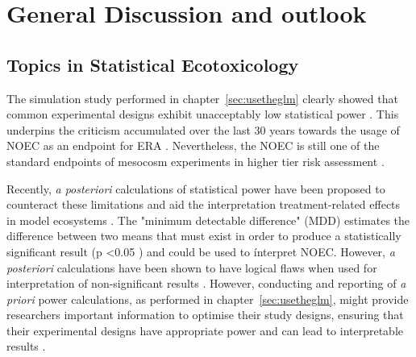 \chapter{General Discussion and outlook}
\label{sec:discussion} 
 
\section{Topics in Statistical Ecotoxicology}
The simulation study performed in chapter~\ref{sec:usetheglm} clearly showed that common experimental designs exhibit unacceptably low statistical power \citep{szocs_statistical_2016, van_der_hoeven_power_1998}.
This underpins the criticism accumulated over the last 30 years towards the usage of NOEC as an endpoint for ERA \citep{fox_comment_2016}. 
Nevertheless, the NOEC is still one of the standard endpoints of mesocosm experiments in higher tier risk assessment \citep{efsa_guidance_2013}.

Recently, \emph{a posteriori} calculations of statistical power have been proposed to counteract these limitations and aid the interpretation treatment-related effects in model ecosystems \citep{brock_minimum_2015}.
The "minimum detectable difference" (MDD) estimates the difference between two means that must exist in order to produce a statistically significant result (p \textless 0.05 \citep{gelman_difference_2006}) and could be used to ínterpret NOEC.
However, \emph{a posteriori} calculations have been shown to have logical flaws when used for interpretation of non-significant results \citep{hoenig_abuse_2001, nakagawa_case_2004}. 
However, conducting and reporting of \emph{a priori} power calculations, as performed in chapter~\ref{sec:usetheglm}, might provide researchers important information to optimise their study designs, ensuring that their experimental designs have appropriate power and can lead to interpretable results \citep{johnson_power_2015}.

